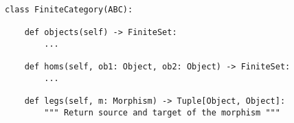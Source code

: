 \begin{verbatim}
class FiniteCategory(ABC):

    def objects(self) -> FiniteSet:
        ...

    def homs(self, ob1: Object, ob2: Object) -> FiniteSet:
        ...

    def legs(self, m: Morphism) -> Tuple[Object, Object]:
        """ Return source and target of the morphism """
\end{verbatim}